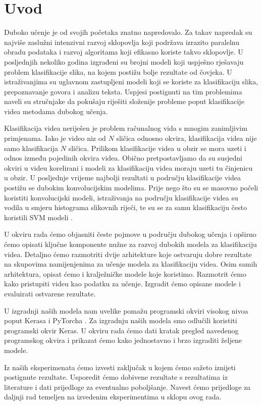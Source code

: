 \documentclass[times, utf8, diplomski,  numeric]{fer}
\begin{document}
\chapter{Uvod}
Duboko učenje je od svojih početaka znatno napredovalo. Za takav napredak su najviše zaslužni intenzivni razvoj sklopovlja koji podržava izrazito paralelnu obradu podataka i razvoj algoritama koji efikasno koriste takvo sklopovlje. U posljednjih nekoliko godina izgrađeni su brojni modeli koji uspješno rješavaju problem klasifikacije slika, na kojem postižu bolje rezultate od čovjeka. U istraživanjima su uglavnom zastupljeni modeli koji se koriste za klasifikaciju slika, prepoznavanje govora i analizu teksta. Uspjesi postignuti na tim problemima naveli su stručnjake da pokušaju riješiti složenije probleme poput klasifikacije videa metodama dubokog učenja. 
\par
Klasifikacija videa neriješen je problem računalnog vida s mnogim zanimljivim primjenama. Iako je video niz od $N$ sličica odnosno okvira, klasifikacija videa nije samo klasifikacija $N$ sličica. Prilikom klasifikacije videa u obzir se mora uzeti i odnos između pojedinih okvira videa. Obično pretpostavljamo da su susjedni okviri u videu korelirani i modeli za klasifikaciju videa moraju uzeti tu činjenicu u obzir. U posljednje vrijeme najbolji rezultati u području klasifikacije videa postižu se dubokim konvolucijskim modelima. Prije nego što su se masovno počeli koristiti konvolucijski modeli, istraživanja na području klasifikacije videa su vodila u smjeru histograma slikovnih riječi, te su se za samu klasifikaciju često koristili SVM modeli \cite{6909619}. 
\par
U okviru rada ćemo objasniti česte pojmove u području dubokog učenja i opširno ćemo opisati ključne komponente nužne za razvoj dubokih modela za klasifikaciju videa. Detaljno ćemo razmotriti dvije arhitekture koje ostvaruju dobre rezultate na skupovima namijenjenima za učenje modela za klasifikaciju videa. Osim samih arhitektura, opisat ćemo i kralježničke modele  koje koristimo. Razmotrit ćemo kako pristupiti videu kao podatku za učenje. Izgradit ćemo opisane modele i evaluirati ostvarene rezultate.
\par
U izgradnji naših modela nam uvelike pomažu programski okviri visokog nivoa poput Kerasa \cite{Keras} i PyTorcha \cite{Pytorch}. Za izgradnju naših modela smo odlučili koristiti programski okvir Keras. U okviru rada ćemo dati kratak pregled navedenog programskog okvira i prikazat ćemo kako jednostavno i brzo izgraditi željene modele.
\par
Iz naših eksperimenata ćemo izvesti zaključak u kojem ćemo sažeto iznijeti postignute rezultate. Usporedit ćemo dobivene rezultate s rezultatima iz literature i dati prijedloge za eventualno poboljšanje. Navest ćemo prijedloge za daljnji rad temeljen na izvedenim eksperimentima u sklopu ovog rada.
\end{document}
